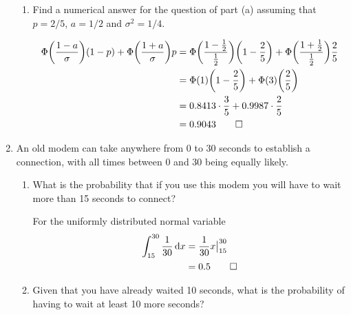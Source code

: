 \documentclass[paper=usletter, fontsize=12pt]{article}
\begin{document}
\begin{enumerate}
\begin{enumerate}
            \item Find a numerical answer for the question of part (a) assuming
            that $p=2/5$, $a=1/2$ and $\sigma^2=1/4$.
            \begin{cproof}

                \begin{align*}
                    \Phi\bigg(\frac{1-a}{\sigma}\bigg)(1-p) + \Phi\bigg(\frac{1+a}{\sigma}\bigg)p &= \Phi\bigg(\frac{1-\frac{1}{2}}{\frac{1}{2}}\bigg)\bigg(1-\frac{2}{5}\bigg) + \Phi\bigg(\frac{1+\frac{1}{2}}{\frac{1}{2}}\bigg)\frac{2}{5}\\
                    & = \Phi(1)\bigg(1-\frac{2}{5}\bigg) + \Phi(3)\bigg(\frac{2}{5}\bigg)\\
                    & = 0.8413 \cdot \frac{3}{5} + 0.9987\cdot \frac{2}{5}\\
                    & = 0.9043 \qedhere
                \end{align*}
                \endgroup

            \end{cproof}

        \end{enumerate}

        \item An old modem can take anywhere from 0 to 30 seconds to establish
        a connection, with all times between 0 and 30 being equally likely.
        \begin{enumerate}

            \item What is the probability that if you use this modem you will
            have to wait more than 15 seconds to connect?
            \begin{cproof}

                For the uniformly distributed normal variable
                \begin{align*}
                    \int_{15}^{30} \frac{1}{30}\mathop{}\!\mathrm{d} x & = \frac{1}{30}x\big\vert_{15}^{30}\\
                    & = 0.5 \qedhere
                \end{align*}
                \endgroup

            \end{cproof}

            \item Given that you have already waited 10 seconds, what is the
            probability of having to wait at least 10 more seconds?
            \begin{cproof}


\end{cproof}
\end{enumerate}
\end{enumerate}
\end{document}
